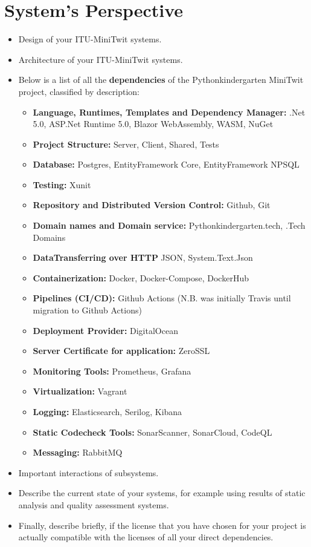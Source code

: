 \section{System's Perspective}

\begin{itemize}
  \item Design of your ITU-MiniTwit systems.
  \item Architecture of your ITU-MiniTwit systems.
  \item Below is a list of all the \textbf{dependencies} of the Pythonkindergarten MiniTwit project, classified by description:
    \begin{itemize}
      \item \textbf{Language, Runtimes, Templates and Dependency Manager:}
      .Net 5.0, ASP.Net Runtime 5.0, Blazor WebAssembly, WASM, NuGet
      \item \textbf{Project Structure:} Server, Client, Shared, Tests
      \item \textbf{Database:} Postgres, EntityFramework Core, EntityFramework NPSQL
      \item \textbf{Testing:} Xunit
      \item \textbf{Repository and Distributed Version Control:} Github, Git
      \item \textbf{Domain names and Domain service:} Pythonkindergarten.tech, .Tech Domains
      \item \textbf{DataTransferring over HTTP} JSON, System.Text.Json
      \item \textbf{Containerization:} Docker, Docker-Compose, DockerHub
      \item \textbf{Pipelines (CI/CD):} Github Actions (N.B. was initially Travis until migration to Github Actions)
      \item \textbf{Deployment Provider:} DigitalOcean
      \item \textbf{Server Certificate for application:} ZeroSSL
      \item \textbf{Monitoring Tools:} Prometheus, Grafana
      \item \textbf{Virtualization:} Vagrant
      \item \textbf{Logging:} Elasticsearch, Serilog, Kibana
      \item \textbf{Static Codecheck Tools:} SonarScanner, SonarCloud, CodeQL
      \item \textbf{Messaging:} RabbitMQ
    \end{itemize}
  \item Important interactions of subsystems.
  \item Describe the current state of your systems, for example using results of static analysis and quality assessment systems.
  \item Finally, describe briefly, if the license that you have chosen for your project is actually compatible with the licenses of all your direct dependencies.
  
\end{itemize}